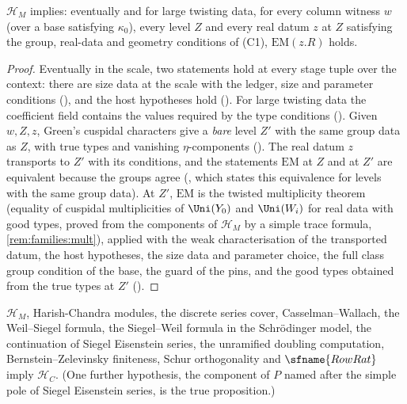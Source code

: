\begin{lemma}\label{pf:bundles:lem:multat}
$\mathcal H_M$ implies: eventually and for large twisting data, for every column witness $w$ (over a base satisfying $\kappa_0$),
every level $Z$ and every real datum $z$ at $Z$ satisfying the group, real-data and geometry conditions of (C1), $\mathrm{EM}(z.R)$
holds.
\end{lemma}

\begin{proof}
Eventually in the scale, two statements hold at every stage tuple over the context: there are size data at the scale with the ledger,
size and parameter conditions (), and the host hypotheses hold
(). For large twisting data the coefficient field contains the values
required by the type conditions (). Given $w,Z,z$, Green's cuspidal
characters give a \emph{bare} level $Z'$ with the same group data as $Z$, with true types and vanishing $\eta$-components
(). The real datum $z$ transports to $Z'$ with its conditions, and the statements
$\mathrm{EM}$ at $Z$ and at $Z'$ are equivalent because the groups agree
(, which states this equivalence for levels with the same
group data). At $Z'$, $\mathrm{EM}$ is the twisted multiplicity theorem  (equality
of cuspidal multiplicities of $\Uni(Y_0)$ and $\Uni(W_i)$ for real data with good types, proved from the components of $\mathcal H_M$
by a simple trace formula, \cref{rem:families:mult}), applied with the weak characterisation of the transported datum, the host
hypotheses, the size data and parameter choice, the full class group condition of the base, the guard of the pins, and the good types
obtained from the true types at $Z'$ ().
\end{proof}

\begin{lemma}\label{pf:bundles:lem:multcover}
$\mathcal H_M$, Harish-Chandra modules, the discrete series cover, Casselman--Wallach, the Weil--Siegel formula, the Siegel--Weil
formula in the Schr\"odinger model, the continuation of Siegel Eisenstein series, the unramified doubling computation,
Bernstein--Zelevinsky finiteness, Schur orthogonality and $\sfname{RowRat}$ imply $\mathcal H_C$. (One further hypothesis, the
component of $P$ named after the simple pole of Siegel Eisenstein series, is the true proposition.)
\end{lemma}

